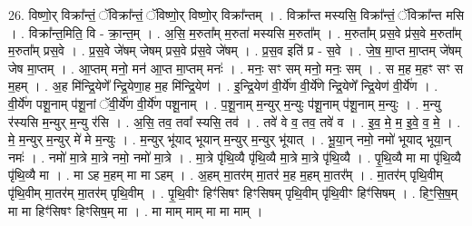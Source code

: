 \documentclass[17pt]{extarticle}
\begin{document}
26. विष्णो॒र् विक्रा᳚न्तं॒ ॅविक्रा᳚न्तं॒ ॅविष्णो॒र् विष्णो॒र् विक्रा᳚न्तम् । . विक्रा᳚न्त मस्यसि॒ विक्रा᳚न्तं॒ ॅविक्रा᳚न्त मसि । . विक्रा᳚न्त॒मिति॒ वि - क्रा॒न्त॒म् । . अ॒सि॒ म॒रुता᳚म् म॒रुता॑ मस्यसि म॒रुता᳚म् । . म॒रुता᳚म् प्रस॒वे प्र॑स॒वे म॒रुता᳚म् म॒रुता᳚म् प्रस॒वे । . प्र॒स॒वे जे॑षम् जेषम् प्रस॒वे प्र॑स॒वे जे॑षम् । . प्र॒स॒व इति॑ प्र - स॒वे । . जे॒ष॒ मा॒प्त मा॒प्तम् जे॑षम् जेष मा॒प्तम् । . आ॒प्तम् मनो॒ मन॑ आ॒प्त मा॒प्तम् मनः॑ । . मनः॒ सꣳ सम् मनो॒ मनः॒ सम् । . स म॒ह म॒हꣳ सꣳ स म॒हम् । . अ॒ह मि॑न्द्रि॒येणे᳚ न्द्रि॒येणा॒ह म॒ह मि॑न्द्रि॒येण॑ । . इ॒न्द्रि॒येण॑ वी॒र्ये॑ण वी॒र्ये॑णे न्द्रि॒येणे᳚ न्द्रि॒येण॑ वी॒र्ये॑ण । . वी॒र्ये॑ण पशू॒नाम् प॑शू॒नां ॅवी॒र्ये॑ण वी॒र्ये॑ण पशू॒नाम् । . प॒शू॒नाम् म॒न्युर् म॒न्युः प॑शू॒नाम् प॑शू॒नाम् म॒न्युः । . म॒न्यु र॑स्यसि म॒न्युर् म॒न्यु र॑सि । . अ॒सि॒ तव॒ तवा᳚ स्यसि॒ तव॑ । . तवे॑ वे व॒ तव॒ तवे॑ व । . इ॒व॒ मे॒ म॒ इ॒वे॒ व॒ मे॒ । . मे॒ म॒न्युर् म॒न्युर् मे॑ मे म॒न्युः । . म॒न्युर् भू॑याद् भूयान् म॒न्युर् म॒न्युर् भू॑यात् । . भू॒या॒न् नमो॒ नमो॑ भूयाद् भूया॒न् नमः॑ । . नमो॑ मा॒त्रे मा॒त्रे नमो॒ नमो॑ मा॒त्रे । . मा॒त्रे पृ॑थि॒व्यै पृ॑थि॒व्यै मा॒त्रे मा॒त्रे पृ॑थि॒व्यै । . पृ॒थि॒व्यै मा मा पृ॑थि॒व्यै पृ॑थि॒व्यै मा । . मा ऽह म॒हम् मा मा ऽहम् । . अ॒हम् मा॒तर॑म् मा॒तर॑ म॒ह म॒हम् मा॒तर᳚म् । . मा॒तर॑म् पृथि॒वीम् पृ॑थि॒वीम् मा॒तर॑म् मा॒तर॑म् पृथि॒वीम् । . पृ॒थि॒वीꣳ हिꣳ॑सिषꣳ हिꣳसिषम् पृथि॒वीम् पृ॑थि॒वीꣳ हिꣳ॑सिषम् । . हिꣳ॒॒सि॒ष॒म् मा मा हिꣳ॑सिषꣳ हिꣳसिष॒म् मा । . मा माम् माम् मा मा माम् । \newline
\end{document}
